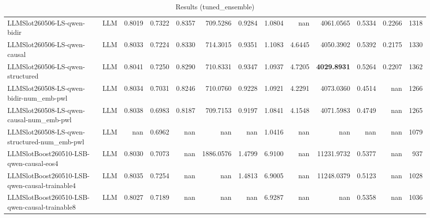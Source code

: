 \begin{table}[htbp]
{\begin{tabular}{ll|rrrrrrrrrr|r}
LLMSlot260506-LS-qwen-bidir & LLM & 0.8019 & 0.7322 & 0.8357 & 709.5286 & 0.9284 & 1.0804 & nan & 4061.0565 & 0.5334 & 0.2266 & 1318 \\
LLMSlot260506-LS-qwen-causal & LLM & 0.8033 & 0.7224 & 0.8330 & 714.3015 & 0.9351 & 1.1083 & 4.6445 & 4050.3902 & 0.5392 & 0.2175 & 1330 \\
LLMSlot260506-LS-qwen-structured & LLM & 0.8041 & 0.7250 & 0.8290 & 710.8331 & 0.9347 & 1.0937 & 4.7205 & \textbf{4029.8931} & 0.5264 & 0.2207 & 1362 \\
LLMSlot260508-LS-qwen-bidir-num\_emb-pwl & LLM & 0.8034 & 0.7031 & 0.8246 & 710.0760 & 0.9228 & 1.0921 & 4.2291 & 4073.0360 & 0.4514 & nan & 1266 \\
LLMSlot260508-LS-qwen-causal-num\_emb-pwl & LLM & 0.8038 & 0.6983 & 0.8187 & 709.7153 & 0.9197 & 1.0841 & 4.1548 & 4071.5983 & 0.4749 & nan & 1265 \\
LLMSlot260508-LS-qwen-structured-num\_emb-pwl & LLM & nan & 0.6962 & nan & nan & nan & 1.0416 & nan & nan & nan & nan & 1079 \\
LLMSlotBoost260510-LSB-qwen-causal-eos4 & LLM & 0.8030 & 0.7073 & nan & 1886.0576 & 1.4799 & 6.9100 & nan & 11231.9732 & 0.5377 & nan & 937 \\
LLMSlotBoost260510-LSB-qwen-causal-trainable4 & LLM & 0.8035 & 0.7254 & nan & nan & 1.4813 & 6.9005 & nan & 11248.0379 & 0.5123 & nan & 1028 \\
LLMSlotBoost260510-LSB-qwen-causal-trainable8 & LLM & 0.8027 & 0.7189 & nan & nan & nan & 6.9287 & nan & nan & 0.5358 & nan & 1036 \\
\bottomrule
\end{tabular}
}
\caption{Results (tuned_ensemble)}
\label{tab:results_tuned_ensemble}
\end{table}